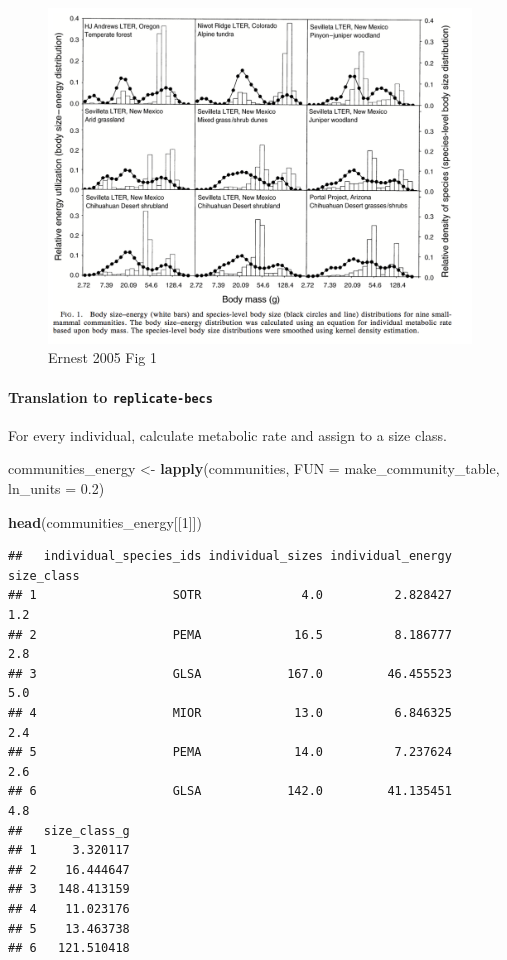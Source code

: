 \documentclass[]{article}
\newenvironment{Shaded}{\begin{snugshade}}{\end{snugshade}}
\newcommand{\KeywordTok}[1]{\textcolor[rgb]{0.13,0.29,0.53}{\textbf{#1}}}
\newcommand{\DataTypeTok}[1]{\textcolor[rgb]{0.13,0.29,0.53}{#1}}
\newcommand{\DecValTok}[1]{\textcolor[rgb]{0.00,0.00,0.81}{#1}}
\newcommand{\FloatTok}[1]{\textcolor[rgb]{0.00,0.00,0.81}{#1}}
\newcommand{\StringTok}[1]{\textcolor[rgb]{0.31,0.60,0.02}{#1}}
\newcommand{\NormalTok}[1]{#1}
\let\oldparagraph\paragraph
\renewcommand{\paragraph}[1]{\oldparagraph{#1}\mbox{}}
\begin{document}
\begin{figure}
\centering
\includegraphics{../ernest-2005-files/ernest2005_fig1.png}
\caption{Ernest 2005 Fig 1}
\end{figure}

\paragraph{\texorpdfstring{Translation to
\texttt{replicate-becs}}{Translation to replicate-becs}}\label{translation-to-replicate-becs-1}

For every individual, calculate metabolic rate and assign to a size
class.

\begin{Shaded}
\begin{Highlighting}[]
\NormalTok{communities_energy <-}\StringTok{ }\KeywordTok{lapply}\NormalTok{(communities, }\DataTypeTok{FUN =}\NormalTok{ make_community_table, }\DataTypeTok{ln_units =} \FloatTok{0.2}\NormalTok{)}

\KeywordTok{head}\NormalTok{(communities_energy[[}\DecValTok{1}\NormalTok{]])}
\end{Highlighting}
\end{Shaded}

\begin{verbatim}
##   individual_species_ids individual_sizes individual_energy size_class
## 1                   SOTR              4.0          2.828427        1.2
## 2                   PEMA             16.5          8.186777        2.8
## 3                   GLSA            167.0         46.455523        5.0
## 4                   MIOR             13.0          6.846325        2.4
## 5                   PEMA             14.0          7.237624        2.6
## 6                   GLSA            142.0         41.135451        4.8
##   size_class_g
## 1     3.320117
## 2    16.444647
## 3   148.413159
## 4    11.023176
## 5    13.463738
## 6   121.510418
\end{verbatim}
\end{document}
